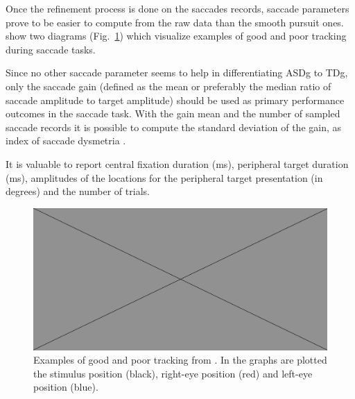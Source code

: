 Once the refinement process is done on the saccades records, saccade parameters prove to be easier to compute from the raw data than the smooth pursuit ones. \cite{pensiero2009saccades} show two diagrams (Fig.~\ref{fig:saccaderecordex}) which visualize examples of good and poor tracking during saccade tasks.

Since no other saccade parameter seems to help in differentiating ASDg to TDg, only the saccade gain (defined as the mean or preferably the median ratio of saccade amplitude to target amplitude) should be used as primary performance outcomes in the saccade task. With the gain mean and the number of sampled saccade records it is possible to compute the standard deviation of the gain, as index of saccade dysmetria \cite{johnson2016review}.

It is valuable to report central fixation duration (ms), peripheral target duration (ms), amplitudes of the locations for the peripheral target presentation (in degrees) and the number of trials.

\begin{figure}[h]
  \centering
  \includegraphics[width=.5\textwidth]{figures/placeholderImg.jpg}
  \caption[Saccades example graph]{Examples of good and poor tracking from \cite{pensiero2009saccades}. In the graphs are plotted the stimulus position (black), right-eye position (red) and left-eye position (blue).}
  \label{fig:saccaderecordex}
\end{figure}
